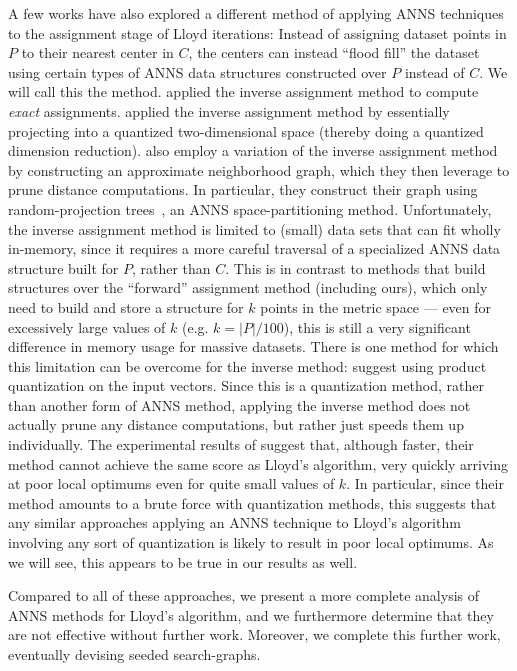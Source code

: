 A few works have also explored a different method of applying ANNS techniques
to the assignment stage of Lloyd iterations:
Instead of assigning dataset points in $P$ to their nearest center in $C$,
the centers can instead ``flood fill'' the dataset
using certain types of ANNS data structures
constructed over $P$ instead of $C$.
We will call this the  method.
\citet{kmnpsw-ekmca-02} applied the inverse assignment method
to compute \emph{exact} assignments.
\citet{AvrithisKAE15}
applied the inverse assignment method
by essentially projecting into a quantized two-dimensional
space (thereby doing a quantized dimension reduction).
\citet{WangWKZL15}
also employ a variation of the inverse assignment method
by constructing an approximate neighborhood graph,
which they then leverage to prune distance computations.
In particular, they construct their graph
using
random-projection trees~\cite{DasguptaF08},
an ANNS space-partitioning method.
Unfortunately,
the inverse assignment method is limited to
(small) data sets that can fit wholly in-memory,
since it requires a more careful traversal of
a specialized ANNS data structure built for $P$, rather than $C$.
This is in contrast to methods that build structures
over the
``forward'' assignment method
(including ours),
which only need to build and store a structure
for $k$ points in the metric space ---
even for excessively large values of $k$ (e.g. $k=|P|/100$),
this is still a very significant difference
in memory usage for massive datasets.
There is one method for which this limitation can
be overcome for the inverse method:
\citet{MatsuiOYA17} suggest
using product quantization
on the input vectors.
Since this is a quantization method,
rather than another form of ANNS method,
applying the inverse method
does not actually prune any distance computations,
but rather just speeds them up individually.
The experimental results of \citet{MatsuiOYA17}
suggest that, although faster,
their method cannot achieve the same score
as Lloyd's algorithm,
very quickly arriving at poor local optimums even for quite small values of $k$.
In particular,
since their method amounts to a brute force
with quantization methods,
this suggests that any similar approaches
applying an ANNS technique to Lloyd's algorithm
involving any sort of quantization is likely to result
in poor local optimums.
As we will see, this appears
to be true in our results as well.

Compared to all of these approaches,
we present a more complete analysis
of ANNS methods
for Lloyd's algorithm,
and we furthermore determine that they
are not effective without further work.
Moreover, we complete this further work,
eventually devising seeded search-graphs.


